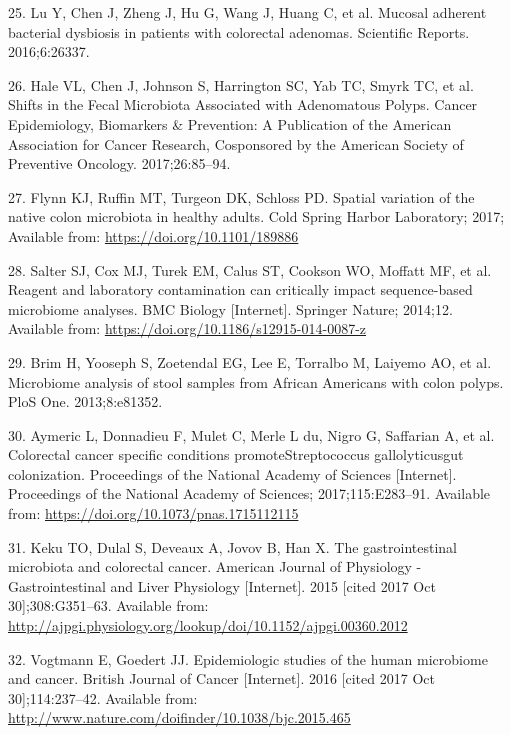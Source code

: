 \documentclass[12pt,]{article}
\begin{document}
\hypertarget{ref-lu_mucosal_2016}{}
25. Lu Y, Chen J, Zheng J, Hu G, Wang J, Huang C, et al. Mucosal
adherent bacterial dysbiosis in patients with colorectal adenomas.
Scientific Reports. 2016;6:26337.

\hypertarget{ref-hale_shifts_2017}{}
26. Hale VL, Chen J, Johnson S, Harrington SC, Yab TC, Smyrk TC, et al.
Shifts in the Fecal Microbiota Associated with Adenomatous Polyps.
Cancer Epidemiology, Biomarkers \& Prevention: A Publication of the
American Association for Cancer Research, Cosponsored by the American
Society of Preventive Oncology. 2017;26:85--94.

\hypertarget{ref-Flynn_preprint_2017}{}
27. Flynn KJ, Ruffin MT, Turgeon DK, Schloss PD. Spatial variation of
the native colon microbiota in healthy adults. Cold Spring Harbor
Laboratory; 2017; Available from: \url{https://doi.org/10.1101/189886}

\hypertarget{ref-Salter_contamination_2014}{}
28. Salter SJ, Cox MJ, Turek EM, Calus ST, Cookson WO, Moffatt MF, et
al. Reagent and laboratory contamination can critically impact
sequence-based microbiome analyses. BMC Biology {[}Internet{]}. Springer
Nature; 2014;12. Available from:
\url{https://doi.org/10.1186/s12915-014-0087-z}

\hypertarget{ref-brim_microbiome_2013}{}
29. Brim H, Yooseph S, Zoetendal EG, Lee E, Torralbo M, Laiyemo AO, et
al. Microbiome analysis of stool samples from African Americans with
colon polyps. PloS One. 2013;8:e81352.

\hypertarget{ref-strep_Aymeric_2017}{}
30. Aymeric L, Donnadieu F, Mulet C, Merle L du, Nigro G, Saffarian A,
et al. Colorectal cancer specific conditions promoteStreptococcus
gallolyticusgut colonization. Proceedings of the National Academy of
Sciences {[}Internet{]}. Proceedings of the National Academy of
Sciences; 2017;115:E283--91. Available from:
\url{https://doi.org/10.1073/pnas.1715112115}

\hypertarget{ref-keku_gastrointestinal_2015}{}
31. Keku TO, Dulal S, Deveaux A, Jovov B, Han X. The gastrointestinal
microbiota and colorectal cancer. American Journal of Physiology -
Gastrointestinal and Liver Physiology {[}Internet{]}. 2015 {[}cited 2017
Oct 30{]};308:G351--63. Available from:
\url{http://ajpgi.physiology.org/lookup/doi/10.1152/ajpgi.00360.2012}

\hypertarget{ref-vogtmann_epidemiologic_2016}{}
32. Vogtmann E, Goedert JJ. Epidemiologic studies of the human
microbiome and cancer. British Journal of Cancer {[}Internet{]}. 2016
{[}cited 2017 Oct 30{]};114:237--42. Available from:
\url{http://www.nature.com/doifinder/10.1038/bjc.2015.465}
\end{document}
